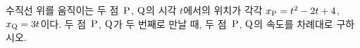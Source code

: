 수직선 위를 움직이는 두 점~$\mathrm{P}$, $\mathrm{Q}$의 시각 $t$에서의 위치가 각각 $x_{\mathrm{P}}=t^2-2t+4$, $x_{\mathrm{Q}}=3t$이다. 두 점~$\mathrm{P}$, $\mathrm{Q}$가 두 번째로 만날 때, 두 점~$\mathrm{P}$, $\mathrm{Q}$의 속도를 차례대로 구하시오.
